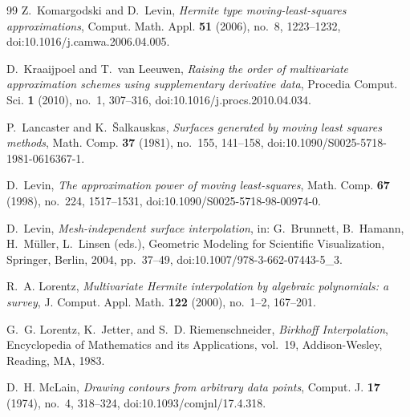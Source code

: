 \documentclass[12pt]{amsart}
\theoremstyle{definition}
\theoremstyle{remark}
\begin{document}
\begin{thebibliography}{99}
Z.~Komargodski and D.~Levin, \emph{Hermite type moving-least-squares approximations}, Comput. Math. Appl. \textbf{51} (2006), no.~8, 1223--1232, doi:10.1016/j.camwa.2006.04.005.

D.~Kraaijpoel and T.~van Leeuwen, \emph{Raising the order of multivariate approximation schemes
using supplementary derivative data}, Procedia Comput. Sci. \textbf{1} (2010), no.~1, 307--316,
doi:10.1016/j.procs.2010.04.034.

P.~Lancaster and K.~\v{S}alkauskas, \emph{Surfaces generated by moving least squares methods}, Math. Comp. \textbf{37} (1981), no.~155, 141--158, doi:10.1090/S0025-5718-1981-0616367-1.

D.~Levin, \emph{The approximation power of moving least-squares}, Math. Comp. \textbf{67} (1998), no.~224, 1517--1531, doi:10.1090/S0025-5718-98-00974-0.

D.~Levin, \emph{Mesh-independent surface interpolation}, in: G.~Brunnett, B.~Hamann, H.~M\"uller, L.~Linsen (eds.), Geometric Modeling for Scientific Visualization, Springer, Berlin, 2004, pp.~37--49, doi:10.1007/978-3-662-07443-5\_3.

R.~A. Lorentz, \emph{Multivariate {H}ermite interpolation by algebraic polynomials: a survey}, J. Comput. Appl. Math. \textbf{122} (2000), no.~1--2, 167--201.

G.~G. Lorentz, K.~Jetter, and S.~D. Riemenschneider, \emph{Birkhoff Interpolation}, Encyclopedia of Mathematics and its Applications, vol.~19, Addison-Wesley, Reading, MA, 1983.

D.~H. McLain, \emph{Drawing contours from arbitrary data points}, Comput. J. \textbf{17} (1974), no.~4, 318--324, doi:10.1093/comjnl/17.4.318.


\end{thebibliography}
\end{document}
